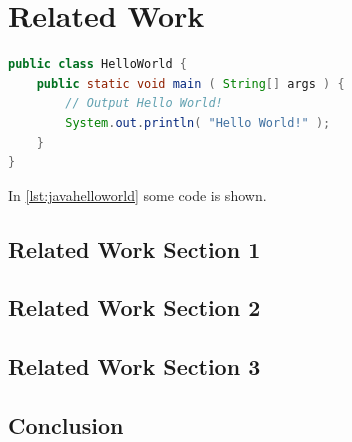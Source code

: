 %


\chapter{Related Work}
\label{sec:related}


\Blindtext[2][1]

\begin{lstlisting}[language=Java, caption={A simple Hellow World example in Java.}, label={lst:javahelloworld}]
public class HelloWorld {
	public static void main ( String[] args ) {
		// Output Hello World!
		System.out.println( "Hello World!" );
	}
}
\end{lstlisting}

In \autoref{lst:javahelloworld} some code is shown.
\Blindtext[1][1]


\section{Related Work Section 1}
\label{sec:related:sec1}

\Blindtext[2][2]


\section{Related Work Section 2}
\label{sec:related:sec2}

\Blindtext[3][2]


\section{Related Work Section 3}
\label{sec:related:sec3}

\Blindtext[4][2]


\section{Conclusion}
\label{sec:related:conclusion}

\Blindtext[2][1]
